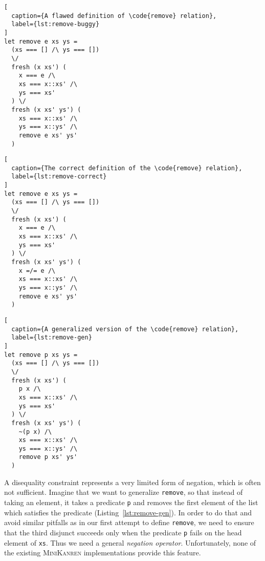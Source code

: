 \begin{minipage}[t]{.3\textwidth}
\begin{lstlisting}[
  caption={A flawed definition of \code{remove} relation},
  label={lst:remove-buggy}
]
let remove e xs ys =
  (xs === [] /\ ys === [])
  \/
  fresh (x xs') (
    x === e /\
    xs === x::xs' /\ 
    ys === xs'
  ) \/
  fresh (x xs' ys') (
    xs === x::xs' /\
    ys === x::ys' /\
    remove e xs' ys'
  )
\end{lstlisting}
\end{minipage}\hfill
\begin{minipage}[t]{.3\textwidth}
\begin{lstlisting}[
  caption={The correct definition of the \code{remove} relation},
  label={lst:remove-correct}
]
let remove e xs ys =
  (xs === [] /\ ys === [])
  \/
  fresh (x xs') (
    x === e /\
    xs === x::xs' /\ 
    ys === xs'
  ) \/
  fresh (x xs' ys') (
    x =/= e /\
    xs === x::xs' /\
    ys === x::ys' /\
    remove e xs' ys'
  )
\end{lstlisting}
\end{minipage}\hfill
\begin{minipage}[t]{.3\textwidth}
\begin{lstlisting}[
  caption={A generalized version of the \code{remove} relation},
  label={lst:remove-gen}
]
let remove p xs ys =
  (xs === [] /\ ys === [])
  \/
  fresh (x xs') (
    p x /\
    xs === x::xs' /\ 
    ys === xs'
  ) \/
  fresh (x xs' ys') (
    ~(p x) /\
    xs === x::xs' /\
    ys === x::ys' /\
    remove p xs' ys'
  )
\end{lstlisting}
\end{minipage}

A disequality constraint represents a very limited form of negation,
which is often not sufficient.
Imagine that we want to generalize \lstinline{remove}, 
so that instead of taking an element, 
it takes a predicate \lstinline{p} and removes
the first element of the list which satisfies the predicate (Listing~\ref{lst:remove-gen}).
In order to do that and avoid similar pitfalls as 
in our first attempt to define \lstinline{remove},
we need to ensure that the third disjunct succeeds 
only when the predicate \lstinline{p} fails on the head element of \lstinline{xs}.
Thus we need a general \emph{negation operator}. 
Unfortunately, none of the existing \textsc{MiniKanren} implementations
provide this feature.

